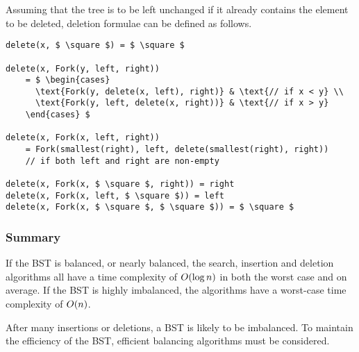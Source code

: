 Assuming that the tree is to be left unchanged if it already contains the element to be deleted, deletion formulae can be defined as follows.
\begin{lstlisting}[mathescape=true]
delete(x, $ \square $) = $ \square $

delete(x, Fork(y, left, right))
    = $ \begin{cases}
      \text{Fork(y, delete(x, left), right)} & \text{// if x < y} \\
      \text{Fork(y, left, delete(x, right))} & \text{// if x > y}
    \end{cases} $

delete(x, Fork(x, left, right))
    = Fork(smallest(right), left, delete(smallest(right), right))
    // if both left and right are non-empty

delete(x, Fork(x, $ \square $, right)) = right
delete(x, Fork(x, left, $ \square $)) = left
delete(x, Fork(x, $ \square $, $ \square $)) = $ \square $
\end{lstlisting}

\subsubsection{Summary}

If the BST is balanced, or nearly balanced, the search, insertion and deletion algorithms all have a time complexity of \( O\!\left(\log n\right) \) in both the worst case and on average.
If the BST is highly imbalanced, the algorithms have a worst-case time complexity of \( O\!\left(n\right) \).

After many insertions or deletions, a BST is likely to be imbalanced.
To maintain the efficiency of the BST, efficient balancing algorithms must be considered.
